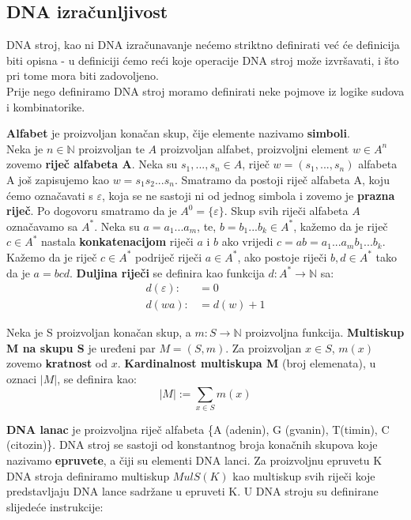 \documentclass[a4paper,oneside,12pt]{memoir} %
\begin{document}
\begin{spacing}{1.5}
\section{DNA izračunljivost}
\label{sec:DNAizr}
DNA stroj, kao ni DNA izračunavanje nećemo striktno definirati već će definicija biti opisna - u definiciji ćemo reći koje operacije DNA stroj može izvršavati, i što pri tome mora biti zadovoljeno.\\ Prije nego definiramo DNA stroj moramo definirati neke pojmove iz logike sudova i kombinatorike.
\begin{defn}
\textbf{Alfabet} je proizvoljan konačan skup, čije elemente nazivamo \textbf{simboli}.\\
Neka je $n \in \mathbb{N}$ proizvoljan te $A$ proizvoljan alfabet, proizvoljni element $w \in A^n$ zovemo \textbf{riječ alfabeta A}. Neka su $s_1,..., s_n \in A$, riječ $w=(s_1,...,s_n)$ alfabeta A još zapisujemo kao $w=s_1s_2...s_n$. Smatramo da postoji riječ alfabeta A, koju ćemo označavati s $\varepsilon$, koja se ne sastoji ni od jednog simbola i zovemo je \textbf{prazna riječ}. Po dogovoru smatramo da je $A^0=\{\varepsilon\}$. Skup svih riječi alfabeta $A$ označavamo sa $A^*$. Neka su $a=a_1...a_m$, te, $b=b_1...b_k \in A^*$, kažemo da je riječ $c \in A^*$ nastala \textbf{konkatenacijom} riječi $a$ i $b$ ako vrijedi $c=ab=a_1...a_mb_1...b_k$. Kažemo da je riječ $c \in A^*$ podriječ riječi $a \in A^*$, ako postoje riječi $b, d \in A^*$ tako da je $a=bcd$. \textbf{Duljina riječi} se definira kao funkcija $d:A^*\to \mathbb{N}$ sa:
\begin{align*}
	d(\varepsilon) :&= 0 \\
	d(wa) :&= d(w)+1
\end{align*}
\end{defn}
\begin{defn}
Neka je S proizvoljan konačan skup, a $m:S \to \mathbb{N}$ proizvoljna funkcija. \textbf{Multiskup M na skupu S} je uređeni par $M=(S,m)$. Za proizvoljan $x\in S$, $m(x)$ zovemo \textbf{kratnost} od $x$. \textbf{Kardinalnost multiskupa M} (broj elemenata), u oznaci $|M|$, se definira kao:
\[|M|:=\sum_{x \in S} m(x)\]
\end{defn}
\begin{defn}
 \textbf{DNA lanac} je proizvoljna riječ alfabeta \{A (adenin), G (gvanin), T(timin), C (citozin)\}. DNA stroj se sastoji od konstantnog broja konačnih skupova koje nazivamo \textbf{epruvete}, a čiji su elementi DNA lanci. Za proizvoljnu epruvetu K DNA stroja definiramo multiskup $MulS(K)$ kao multiskup svih riječi koje predstavljaju DNA lance sadržane u epruveti K. U DNA stroju su definirane slijedeće instrukcije:

\end{defn}
\end{spacing}
\end{document}
